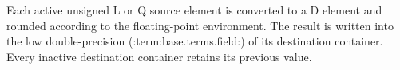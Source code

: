 Each active unsigned L or Q source element is converted to a D element and
rounded according to the floating-point environment. The result is written
into the low double-precision (:term:base.terms.field:) of its destination container. Every
inactive destination container retains its previous value.
